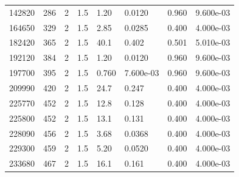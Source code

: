 \documentclass[preview]{standalone}
\begin{document}
{{{{{{{{{{{{{\begin{tabular}{L{1.2cm}C{1.2cm} C{0.3cm}C{0.5cm} C{1.4cm}C{1.4cm} C{1.4cm}C{1.4cm}}
  142820  &   286  & 2     & 1.5 &  1.20  & 0.0120  & 0.960 &  9.600e-03   \\ 
  164650  &   329  & 2     & 1.5 &  2.85  & 0.0285  & 0.400 &  4.000e-03   \\ 
  182420  &   365  & 2     & 1.5 &  40.1  & 0.402  & 0.501 &  5.010e-03   \\ 
  192120  &   384  & 2     & 1.5 &  1.20  & 0.0120  & 0.960 &  9.600e-03   \\ 
  197700  &   395  & 2     & 1.5 &  0.760  & 7.600e-03  & 0.960 &  9.600e-03   \\ 
  209990  &   420  & 2     & 1.5 &  24.7  & 0.247  & 0.400 &  4.000e-03   \\ 
  225770  &   452  & 2     & 1.5 &  12.8  & 0.128  & 0.400 &  4.000e-03   \\ 
  225800  &   452  & 2     & 1.5 &  13.1  & 0.131  & 0.400 &  4.000e-03   \\ 
  228090  &   456  & 2     & 1.5 &  3.68  & 0.0368  & 0.400 &  4.000e-03   \\ 
  229300  &   459  & 2     & 1.5 &  5.20  & 0.0520  & 0.400 &  4.000e-03   \\ 
  233680  &   467  & 2     & 1.5 &  16.1  & 0.161  & 0.400 &  4.000e-03   \\ 
\hline 
\end{tabular} 

}}}}}}}}}}}}}
\end{document}
